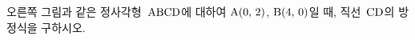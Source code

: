 \noindent\begin{minipage}[t]{0.58\linewidth}\vspace{0pt}\raggedright 오른쪽 그림과 같은 정사각형~$\mathrm{ABCD}$에 대하여 $\mathrm{A}(0,\mkern3mu 2)$, $\mathrm{B}(4,\mkern3mu 0)$일 때, 직선~$\mathrm{CD}$의 방정식을 구하시오. \end{minipage}\hfill\begin{minipage}[t]{0.4\linewidth}\vspace{0pt}\centering \resizebox{\ifdim\width>\linewidth\linewidth\else\width\fi}{!}{}\end{minipage}\par

